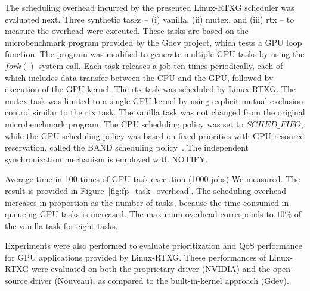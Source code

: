 The scheduling overhead incurred by the presented Linux-RTXG scheduler was evaluated next.
Three synthetic tasks -- (i) vanilla, (ii) mutex, and (iii) rtx -- to measure the overhead were executed.
These tasks are based on the microbenchmark program provided by the Gdev project, which tests a GPU loop function.
The program was modified to generate multiple GPU tasks by using the $fork()$ system call.
Each task releases a job ten times periodically, each of which includes data transfer between the CPU and the GPU, followed by execution of the GPU kernel.
The rtx task was scheduled by Linux-RTXG.
The mutex task was limited to a single GPU kernel by using explicit mutual-exclusion control similar to the rtx task.
The vanilla task was not changed from the original microbenchmark program.
The CPU scheduling policy was set to $SCHED\_FIFO$, while the GPU scheduling policy was based on fixed priorities with GPU-resource reservation, called the BAND scheduling policy~\cite{kato:gdev}.
The independent synchronization mechanism is employed with NOTIFY.

Average time in 100 times of GPU task execution (1000 jobs) We measured.
The result is provided in Figure~\ref{fig:fp_task_overhead}.
The scheduling overhead increases in proportion as the number of tasks, because the time consumed in queueing GPU tasks is increased.
The maximum overhead corresponds to $10\%$ of the vanilla task for eight tasks.

Experiments were also performed to evaluate prioritization and QoS performance for GPU applications provided by Linux-RTXG.
These performances of Linux-RTXG were evaluated on both the proprietary driver (NVIDIA) and the open-source driver (Nouveau), as compared to the built-in-kernel approach (Gdev).


